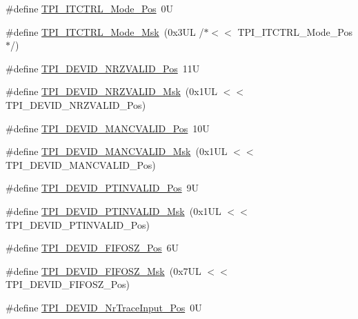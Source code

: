\begin{DoxyCompactItemize}
\item 
\#define \mbox{\hyperlink{group___c_m_s_i_s___t_p_i_gaa847adb71a1bc811d2e3190528f495f0}{T\+P\+I\+\_\+\+I\+T\+C\+T\+R\+L\+\_\+\+Mode\+\_\+\+Pos}}~0U
\item 
\#define \mbox{\hyperlink{group___c_m_s_i_s___t_p_i_gad6f87550b468ad0920d5f405bfd3f017}{T\+P\+I\+\_\+\+I\+T\+C\+T\+R\+L\+\_\+\+Mode\+\_\+\+Msk}}~(0x3\+U\+L /$\ast$$<$$<$ T\+P\+I\+\_\+\+I\+T\+C\+T\+R\+L\+\_\+\+Mode\+\_\+\+Pos$\ast$/)
\item 
\#define \mbox{\hyperlink{group___c_m_s_i_s___t_p_i_ga9f46cf1a1708575f56d6b827766277f4}{T\+P\+I\+\_\+\+D\+E\+V\+I\+D\+\_\+\+N\+R\+Z\+V\+A\+L\+I\+D\+\_\+\+Pos}}~11U
\item 
\#define \mbox{\hyperlink{group___c_m_s_i_s___t_p_i_gacecc8710a8f6a23a7d1d4f5674daf02a}{T\+P\+I\+\_\+\+D\+E\+V\+I\+D\+\_\+\+N\+R\+Z\+V\+A\+L\+I\+D\+\_\+\+Msk}}~(0x1\+U\+L $<$$<$ T\+P\+I\+\_\+\+D\+E\+V\+I\+D\+\_\+\+N\+R\+Z\+V\+A\+L\+I\+D\+\_\+\+Pos)
\item 
\#define \mbox{\hyperlink{group___c_m_s_i_s___t_p_i_ga675534579d9e25477bb38970e3ef973c}{T\+P\+I\+\_\+\+D\+E\+V\+I\+D\+\_\+\+M\+A\+N\+C\+V\+A\+L\+I\+D\+\_\+\+Pos}}~10U
\item 
\#define \mbox{\hyperlink{group___c_m_s_i_s___t_p_i_ga4c3ee4b1a34ad1960a6b2d6e7e0ff942}{T\+P\+I\+\_\+\+D\+E\+V\+I\+D\+\_\+\+M\+A\+N\+C\+V\+A\+L\+I\+D\+\_\+\+Msk}}~(0x1\+U\+L $<$$<$ T\+P\+I\+\_\+\+D\+E\+V\+I\+D\+\_\+\+M\+A\+N\+C\+V\+A\+L\+I\+D\+\_\+\+Pos)
\item 
\#define \mbox{\hyperlink{group___c_m_s_i_s___t_p_i_ga974cccf4c958b4a45cb71c7b5de39b7b}{T\+P\+I\+\_\+\+D\+E\+V\+I\+D\+\_\+\+P\+T\+I\+N\+V\+A\+L\+I\+D\+\_\+\+Pos}}~9U
\item 
\#define \mbox{\hyperlink{group___c_m_s_i_s___t_p_i_ga1ca84d62243e475836bba02516ba6b97}{T\+P\+I\+\_\+\+D\+E\+V\+I\+D\+\_\+\+P\+T\+I\+N\+V\+A\+L\+I\+D\+\_\+\+Msk}}~(0x1\+U\+L $<$$<$ T\+P\+I\+\_\+\+D\+E\+V\+I\+D\+\_\+\+P\+T\+I\+N\+V\+A\+L\+I\+D\+\_\+\+Pos)
\item 
\#define \mbox{\hyperlink{group___c_m_s_i_s___t_p_i_ga3c7bb073c7ef96c2c3491c523fcb5bbe}{T\+P\+I\+\_\+\+D\+E\+V\+I\+D\+\_\+\+F\+I\+F\+O\+S\+Z\+\_\+\+Pos}}~6U
\item 
\#define \mbox{\hyperlink{group___c_m_s_i_s___t_p_i_gac7e718d8f239920d5b65e3eaa1c490df}{T\+P\+I\+\_\+\+D\+E\+V\+I\+D\+\_\+\+F\+I\+F\+O\+S\+Z\+\_\+\+Msk}}~(0x7\+U\+L $<$$<$ T\+P\+I\+\_\+\+D\+E\+V\+I\+D\+\_\+\+F\+I\+F\+O\+S\+Z\+\_\+\+Pos)
\item 
\#define \mbox{\hyperlink{group___c_m_s_i_s___t_p_i_ga80ecae7fec479e80e583f545996868ed}{T\+P\+I\+\_\+\+D\+E\+V\+I\+D\+\_\+\+Nr\+Trace\+Input\+\_\+\+Pos}}~0U

\end{DoxyCompactItemize}
